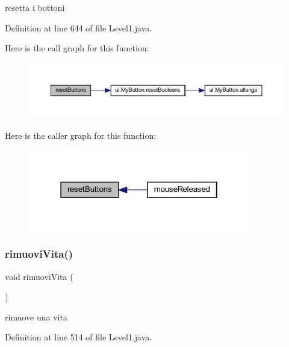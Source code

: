 resetta i bottoni 



Definition at line 644 of file Level1.\+java.

Here is the call graph for this function\+:\nopagebreak
\begin{figure}[H]
\begin{center}
\leavevmode
\includegraphics[width=350pt]{classscenes_1_1_level1_a548cf4795e9d559d0c0cce0bb57a5251_cgraph}
\end{center}
\end{figure}
Here is the caller graph for this function\+:\nopagebreak
\begin{figure}[H]
\begin{center}
\leavevmode
\includegraphics[width=274pt]{classscenes_1_1_level1_a548cf4795e9d559d0c0cce0bb57a5251_icgraph}
\end{center}
\end{figure}
\mbox{\label{classscenes_1_1_level1_a484775c889ccd8602b66ad795b141534}} 
\subsubsection{\texorpdfstring{rimuovi\+Vita()}{rimuoviVita()}}
{\footnotesize\ttfamily void rimuovi\+Vita (\begin{DoxyParamCaption}{ }\end{DoxyParamCaption})}



rimuove una vita 



Definition at line 514 of file Level1.\+java.

